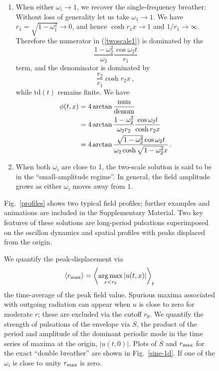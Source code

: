 \documentclass[%
reprint,
superscriptaddress,
amsmath,amssymb,
aps,
prd,
floatfix,
nofootinbib
]{revtex4-1}
\DeclareMathOperator*{\argmax}{arg\,max}
\begin{document}
\begin{figure}
\begin{enumerate}
\item When either $\omega_i \rightarrow 1$, we recover the single-frequency breather: Without loss of generality let us take $\omega_1\to1$. We have $r_1=\sqrt{1-\omega_1^2}\to0$, and hence $\cosh r_1 x\to1$ and $1/r_1 \to \infty$. Therefore the numerator in (\ref{twoscale1}) is dominated by the
  \begin{equation}
    \frac{1-\omega^2_2}{\omega_2}\frac{\cos\omega_2 t}{r_1}
  \end{equation}
  term, and the denominator is dominated by
  \begin{equation}
    \frac{r_2}{r_1}\cosh r_2 x\,,
  \end{equation}
  while $\mathrm{td}(t)$ remains finite. We have
  \begin{equation}\label{onescalep1}
    \begin{aligned}
      \phi(t,x) &= 4\arctan \frac{\rm num}{\rm denom}\\ &= 4\arctan \frac{1-\omega^2_2}{\omega_2 r_2}\frac{\cos\omega_2 t}{\cosh r_2 x}\\
      &=4\arctan \frac{\sqrt{1-\omega_2^2}\cos\omega_2 t}{\omega_2 \cosh \sqrt{1-\omega_2^2} x}\,.
    \end{aligned}
  \end{equation}

\item When both $\omega_i$ are close to 1, the two-scale solution is said to be in the ``small-amplitude regime''. In general, the field amplitude grows as either $\omega_i$ moves away from $1$.
\end{enumerate}

Fig.~\ref{profiles} shows two typical field profiles; further examples and animations are included in the Supplementary Material. Two key features of these solutions are long-period pulsations superimposed on the oscillon dynamics and spatial profiles with peaks displaced from the origin.    

We quantify the peak-displacement via
%
\begin{equation}
  \langle r_{\rm max} \rangle  = \left\langle \argmax_{x < r_0} |u(t,x)| \right\rangle_t
\end{equation}
%
the time-average of the peak field value. Spurious maxima associated with outgoing radiation can appear when $u$ is close to zero for moderate $r$; these are excluded via the cutoff  $r_0$. We quantify the strength of pulsations of the envelope via $S$, the product of the period and amplitude of the dominant periodic mode in the time series of maxima at the origin, $|u(t,0)|$.  Plots of $S$ and $r_{\rm max}$ for the exact ``double breather'' are shown in Fig.~\ref{sine-1d}. If one of the $\omega_i$ is close to unity $r_{\rm max}$ is zero. 


\end{figure}
\end{document}
